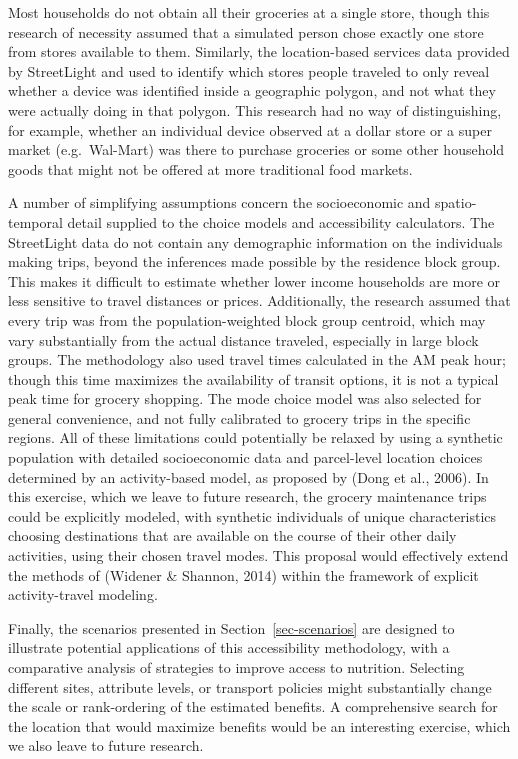 \documentclass[
  letterpaper,
  number,
  review,
  doubleblind,
  3p]{elsarticle}
\begin{document}
Most households do not obtain all their groceries at a single store,
though this research of necessity assumed that a simulated person chose
exactly one store from stores available to them. Similarly, the
location-based services data provided by StreetLight and used to
identify which stores people traveled to only reveal whether a device
was identified inside a geographic polygon, and not what they were
actually doing in that polygon. This research had no way of
distinguishing, for example, whether an individual device observed at a
dollar store or a super market (e.g.~Wal-Mart) was there to purchase
groceries or some other household goods that might not be offered at
more traditional food markets.

A number of simplifying assumptions concern the socioeconomic and
spatio-temporal detail supplied to the choice models and accessibility
calculators. The StreetLight data do not contain any demographic
information on the individuals making trips, beyond the inferences made
possible by the residence block group. This makes it difficult to
estimate whether lower income households are more or less sensitive to
travel distances or prices. Additionally, the research assumed that
every trip was from the population-weighted block group centroid, which
may vary substantially from the actual distance traveled, especially in
large block groups. The methodology also used travel times calculated in
the AM peak hour; though this time maximizes the availability of transit
options, it is not a typical peak time for grocery shopping. The mode
choice model was also selected for general convenience, and not fully
calibrated to grocery trips in the specific regions. All of these
limitations could potentially be relaxed by using a synthetic population
with detailed socioeconomic data and parcel-level location choices
determined by an activity-based model, as proposed by (Dong et al.,
2006). In this exercise, which we leave to future research, the grocery
maintenance trips could be explicitly modeled, with synthetic
individuals of unique characteristics choosing destinations that are
available on the course of their other daily activities, using their
chosen travel modes. This proposal would effectively extend the methods
of (Widener \& Shannon, 2014) within the framework of explicit
activity-travel modeling.

Finally, the scenarios presented in Section~\ref{sec-scenarios} are
designed to illustrate potential applications of this accessibility
methodology, with a comparative analysis of strategies to improve access
to nutrition. Selecting different sites, attribute levels, or transport
policies might substantially change the scale or rank-ordering of the
estimated benefits. A comprehensive search for the location that would
maximize benefits would be an interesting exercise, which we also leave
to future research.
\end{document}
